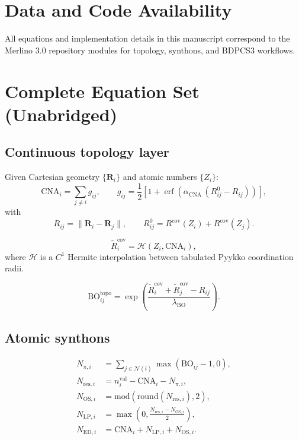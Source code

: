 \documentclass[a4paper,11pt]{article}
\begin{document}
\section*{Data and Code Availability}
All equations and implementation details in this manuscript correspond to the Merlino 3.0 repository modules for topology, synthons, and BDPCS3 workflows.

\appendix
\section{Complete Equation Set (Unabridged)}\label{app:eqs}

\subsection{Continuous topology layer}
Given Cartesian geometry $\{\mathbf{R}_i\}$ and atomic numbers $\{Z_i\}$:
\begin{equation}
\mathrm{CNA}_i = \sum_{j\neq i} g_{ij},
\qquad
g_{ij} = \frac{1}{2}\left[1+\operatorname{erf}\!\left(\alpha_{\mathrm{CNA}}\,(R^0_{ij}-R_{ij})\right)\right],
\end{equation}
with
\begin{equation}
R_{ij}=\lVert \mathbf{R}_i-\mathbf{R}_j\rVert,
\qquad
R^0_{ij}=R^{\mathrm{cov}}(Z_i)+R^{\mathrm{cov}}(Z_j).
\end{equation}

\begin{equation}
\tilde R^{\mathrm{cov}}_i = \mathcal{H}\!\left(Z_i,\mathrm{CNA}_i\right),
\end{equation}
where $\mathcal{H}$ is a $C^1$ Hermite interpolation between tabulated Pyykko coordination radii.

\begin{equation}
\mathrm{BO}_{ij}^{\mathrm{topo}}
=\exp\!\left(
\frac{\tilde R^{\mathrm{cov}}_i+\tilde R^{\mathrm{cov}}_j-R_{ij}}{\lambda_{\mathrm{BO}}}
\right).
\end{equation}

\subsection{Atomic synthons}
\begin{align}
N_{\pi,i} &= \sum_{j\in\mathcal{N}(i)} \max(\mathrm{BO}_{ij}-1,0),\\
N_{\mathrm{res},i} &= n^{\mathrm{val}}_i-\mathrm{CNA}_i-N_{\pi,i},\\
N_{\mathrm{OS},i} &= \mathrm{mod}\!\left(\mathrm{round}(N_{\mathrm{res},i}),2\right),\\
N_{\mathrm{LP},i} &= \max\!\left(0,\frac{N_{\mathrm{res},i}-N_{\mathrm{OS},i}}{2}\right),\\
N_{\mathrm{ED},i} &= \mathrm{CNA}_i+N_{\mathrm{LP},i}+N_{\mathrm{OS},i}.
\end{align}
\end{document}
